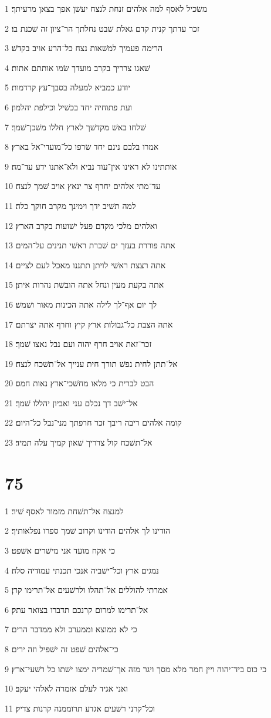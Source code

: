 \par 1 משׂכיל לאסף למה אלהים זנחת לנצח יעשׁן אפך בצאן מרעיתך׃
\par 2 זכר עדתך קנית קדם גאלת שׁבט נחלתך הר־ציון זה שׁכנת בו׃
\par 3 הרימה פעמיך למשׁאות נצח כל־הרע אויב בקדשׁ׃
\par 4 שׁאגו צרריך בקרב מועדך שׂמו אותתם אתות׃
\par 5 יודע כמביא למעלה בסבך־עץ קרדמות׃
\par 6 ועת פתוחיה יחד בכשׁיל וכילפת יהלמון׃
\par 7 שׁלחו באשׁ מקדשׁך לארץ חללו משׁכן־שׁמך׃
\par 8 אמרו בלבם נינם יחד שׂרפו כל־מועדי־אל בארץ׃
\par 9 אותתינו לא ראינו אין־עוד נביא ולא־אתנו ידע עד־מה׃
\par 10 עד־מתי אלהים יחרף צר ינאץ אויב שׁמך לנצח׃
\par 11 למה תשׁיב ידך וימינך מקרב חוקך כלה׃
\par 12 ואלהים מלכי מקדם פעל ישׁועות בקרב הארץ׃
\par 13 אתה פוררת בעזך ים שׁברת ראשׁי תנינים על־המים׃
\par 14 אתה רצצת ראשׁי לויתן תתננו מאכל לעם לציים׃
\par 15 אתה בקעת מעין ונחל אתה הובשׁת נהרות איתן׃
\par 16 לך יום אף־לך לילה אתה הכינות מאור ושׁמשׁ׃
\par 17 אתה הצבת כל־גבולות ארץ קיץ וחרף אתה יצרתם׃
\par 18 זכר־זאת אויב חרף יהוה ועם נבל נאצו שׁמך׃
\par 19 אל־תתן לחית נפשׁ תורך חית ענייך אל־תשׁכח לנצח׃
\par 20 הבט לברית כי מלאו מחשׁכי־ארץ נאות חמס׃
\par 21 אל־ישׁב דך נכלם עני ואביון יהללו שׁמך׃
\par 22 קומה אלהים ריבה ריבך זכר חרפתך מני־נבל כל־היום׃
\par 23 אל־תשׁכח קול צרריך שׁאון קמיך עלה תמיד׃

\chapter{75}

\par 1 למנצח אל־תשׁחת מזמור לאסף שׁיר׃
\par 2 הודינו לך אלהים הודינו וקרוב שׁמך ספרו נפלאותיך׃
\par 3 כי אקח מועד אני מישׁרים אשׁפט׃
\par 4 נמגים ארץ וכל־ישׁביה אנכי תכנתי עמודיה סלה׃
\par 5 אמרתי להוללים אל־תהלו ולרשׁעים אל־תרימו קרן׃
\par 6 אל־תרימו למרום קרנכם תדברו בצואר עתק׃
\par 7 כי לא ממוצא וממערב ולא ממדבר הרים׃
\par 8 כי־אלהים שׁפט זה ישׁפיל וזה ירים׃
\par 9 כי כוס ביד־יהוה ויין חמר מלא מסך ויגר מזה אך־שׁמריה ימצו ישׁתו כל רשׁעי־ארץ׃
\par 10 ואני אגיד לעלם אזמרה לאלהי יעקב׃
\par 11 וכל־קרני רשׁעים אגדע תרוממנה קרנות צדיק׃

